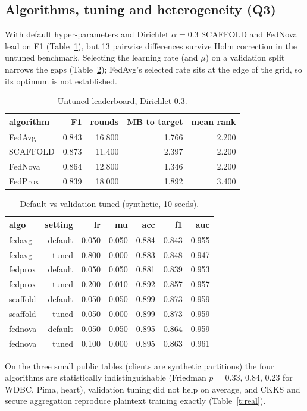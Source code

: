 \documentclass[conference]{IEEEtran}
\begin{document}
\subsection{Algorithms, tuning and heterogeneity (Q3)}
With default hyper-parameters and Dirichlet $\alpha=0.3$ SCAFFOLD and FedNova lead on F1 (Table~\ref{t:lb}), but 13 pairwise differences survive Holm correction in the untuned benchmark. Selecting the learning rate (and $\mu$) on a validation split narrows the gaps (Table~\ref{t:tun}); FedAvg's selected rate sits at the edge of the grid, so its optimum is not established.
\begin{table}[t]\centering\caption{Untuned leaderboard, Dirichlet 0.3.}\label{t:lb}\scriptsize
\begin{tabular}{lrrrr}\toprule
algorithm & F1 & rounds & MB to target & mean rank \\\midrule
FedAvg & 0.843 & 16.800 & 1.766 & 2.200 \\
SCAFFOLD & 0.873 & 11.400 & 2.397 & 2.200 \\
FedNova & 0.864 & 12.800 & 1.346 & 2.200 \\
FedProx & 0.839 & 18.000 & 1.892 & 3.400 \\\bottomrule\end{tabular}\end{table}
\begin{table}[t]\centering\caption{Default vs validation-tuned (synthetic, 10 seeds).}\label{t:tun}\scriptsize
\begin{tabular}{lrrrrrr}\toprule
algo & setting & lr & mu & acc & f1 & auc \\\midrule
fedavg & default & 0.050 & 0.050 & 0.884 & 0.843 & 0.955 \\
fedavg & tuned & 0.800 & 0.000 & 0.883 & 0.848 & 0.947 \\
fedprox & default & 0.050 & 0.050 & 0.881 & 0.839 & 0.953 \\
fedprox & tuned & 0.200 & 0.010 & 0.892 & 0.857 & 0.957 \\
scaffold & default & 0.050 & 0.050 & 0.899 & 0.873 & 0.959 \\
scaffold & tuned & 0.050 & 0.000 & 0.899 & 0.873 & 0.959 \\
fednova & default & 0.050 & 0.050 & 0.895 & 0.864 & 0.959 \\
fednova & tuned & 0.100 & 0.000 & 0.895 & 0.863 & 0.961 \\\bottomrule\end{tabular}\end{table}
On the three small public tables (clients are synthetic partitions) the four algorithms are statistically indistinguishable (Friedman $p$ = 0.33, 0.84, 0.23 for WDBC, Pima, heart), validation tuning did not help on average, and CKKS and secure aggregation reproduce plaintext training exactly (Table~\ref{t:real}).
\end{document}
